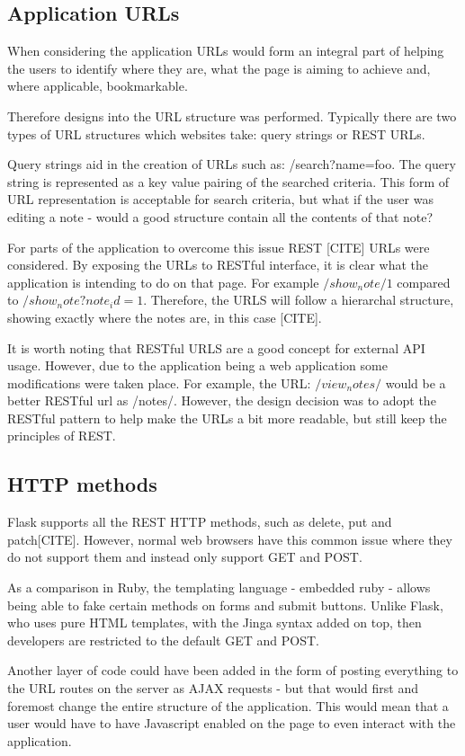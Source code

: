 \subsection{Application URLs}
When considering the application URLs would form an integral part of helping the users to identify where they are, what the page is aiming to achieve and, where applicable, bookmarkable.

Therefore designs into the URL structure was performed. Typically there are two types of URL structures which websites take: query strings or REST URLs.

Query strings aid in the creation of URLs such as: /search?name=foo. The query string is represented as a key value pairing of the searched criteria. This form of URL representation is acceptable for search criteria, but what if the user was editing a note - would a good structure contain all the contents of that note?

For parts of the application to overcome this issue REST [CITE] URLs were considered. By exposing the URLs to RESTful interface, it is clear what the application is intending to do on that page. For example $/show_note/1$ compared to $/show_note?note_id=1$. Therefore, the URLS will follow a hierarchal structure, showing exactly where the notes are, in this case [CITE].

It is worth noting that RESTful URLS are a good concept for external API usage. However, due to the application being a web application some modifications were taken place. For example, the URL: $/view_notes/$ would be a better RESTful url as /notes/. However, the design decision was to adopt the RESTful pattern to help make the URLs a bit more readable, but still keep the principles of REST.

\subsection{HTTP methods}
Flask supports all the REST HTTP methods, such as delete, put and patch[CITE]. However, normal web browsers have this common issue where they do not support them and instead only support GET and POST.

As a comparison in Ruby, the templating language - embedded ruby - allows being able to fake certain methods on forms and submit buttons. Unlike Flask, who uses pure HTML templates, with the Jinga syntax added on top, then developers are restricted to the default GET and POST.

Another layer of code could have been added in the form of posting everything to the URL routes on the server as AJAX requests - but that would first and foremost change the entire structure of the application. This would mean that a user would have to have Javascript enabled on the page to even interact with the application.

